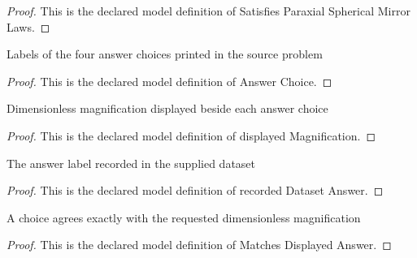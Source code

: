 \begin{proof}
  This is the declared model definition of Satisfies Paraxial Spherical Mirror Laws.
\end{proof}
\begin{definition}
  \label{def:physics:phyx-mini-0160:phyxminiproblems-problemphyxmini0160-answerchoice}
  Labels of the four answer choices printed in the source problem
\end{definition}
\begin{proof}
  This is the declared model definition of Answer Choice.
\end{proof}
\begin{definition}
  \label{def:physics:phyx-mini-0160:phyxminiproblems-problemphyxmini0160-answerchoice-displayedmagnification}
  Dimensionless magnification displayed beside each answer choice
\end{definition}
\begin{proof}
  This is the declared model definition of displayed Magnification.
\end{proof}
\begin{definition}
  \label{def:physics:phyx-mini-0160:phyxminiproblems-problemphyxmini0160-recordeddatasetanswer}
  The answer label recorded in the supplied dataset
\end{definition}
\begin{proof}
  This is the declared model definition of recorded Dataset Answer.
\end{proof}
\begin{definition}
  \label{def:physics:phyx-mini-0160:phyxminiproblems-problemphyxmini0160-matchesdisplayedanswer}
  A choice agrees exactly with the requested dimensionless magnification
\end{definition}
\begin{proof}
  This is the declared model definition of Matches Displayed Answer.
\end{proof}
